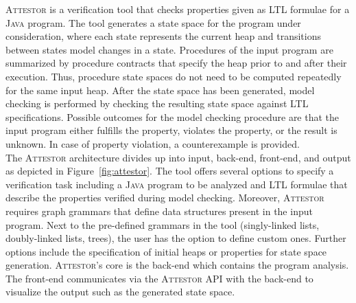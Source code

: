 \documentclass[a4paper, 12pt, twoside]{report}
\begin{document}
	\textsc{Attestor} is a verification tool that checks properties given as LTL formulae for a \textsc{Java} program. The tool generates a state space for the program under consideration, where each state represents the current heap and transitions between states model changes in a state. Procedures of the input program are summarized by procedure contracts that specify the heap prior to and after their execution. Thus, procedure state spaces do not need to be computed repeatedly for the same input heap. After the state space has been generated, model checking is performed by checking the resulting state space against LTL specifications. Possible outcomes for the model checking procedure are that the input program either fulfills the property, violates the property, or the result is unknown. In case of property violation, a counterexample is provided.\\
	
	The \textsc{Attestor} architecture divides up into input, back-end, front-end, and output as depicted in Figure~\ref{fig:attestor}. The tool offers several options to specify a verification task including a \textsc{Java} program to be analyzed and LTL formulae that describe the properties verified during model checking. Moreover, \textsc{Attestor} requires graph grammars that define data structures present in the input program. Next to the pre-defined grammars in the tool (singly-linked lists, doubly-linked lists, trees), the user has the option to define custom ones. Further options include the specification of initial heaps or properties for state space generation. \textsc{Attestor}'s core is the back-end which contains the program analysis. The front-end communicates via the \textsc{Attestor} API with the back-end to visualize the output such as the generated state space.\\	
	
\end{document}
